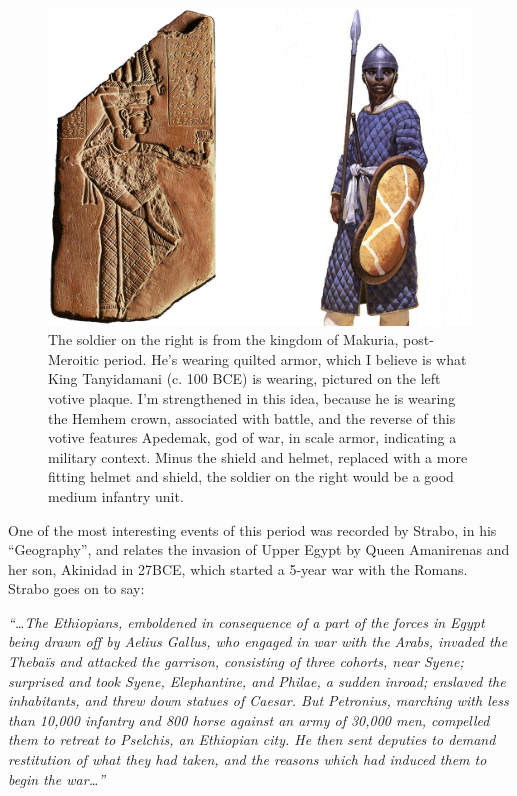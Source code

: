 \documentclass[a4paper,12pt]{scrreprt}
\begin{document}
\begin{figure}[H]
	\centering
	\includegraphics[width=\textwidth]{img/king_tanyidamani_armor_soldier}
	\caption{The soldier on the right is from the kingdom of Makuria, post-Meroitic period. He's wearing quilted armor, which I believe is what King Tanyidamani (c. 100 BCE) is wearing, pictured on the left votive plaque. I'm strengthened in this idea, because he is wearing the Hemhem crown, associated with battle, and the reverse of this votive features Apedemak, god of war, in scale armor, indicating a military context. Minus the shield and helmet, replaced with a more fitting helmet and shield, the soldier on the right would be a good medium infantry unit.}
\end{figure}

One of the most interesting events of this period was recorded by Strabo, in his “Geography”, and relates the invasion of Upper Egypt by Queen Amanirenas and her son, Akinidad in 27BCE, which started a 5-year war with the Romans. Strabo goes on to say:\\

\begin{center}
\textit{“…The Ethiopians, emboldened in consequence of a part of the forces in Egypt being drawn off by Aelius Gallus, who engaged in war with the Arabs, invaded the Thebaïs and attacked the garrison, consisting of three cohorts, near Syene; surprised and took Syene, Elephantine, and Philae, a sudden inroad; enslaved the inhabitants, and threw down statues of Caesar. But Petronius, marching with less than 10,000 infantry and 800 horse against an army of 30,000 men, compelled them to retreat to Pselchis, an Ethiopian city. He then sent deputies to demand restitution of what they had taken, and the reasons which had induced them to begin the war…”}\\[12pt]
\end{center}
\end{document}
